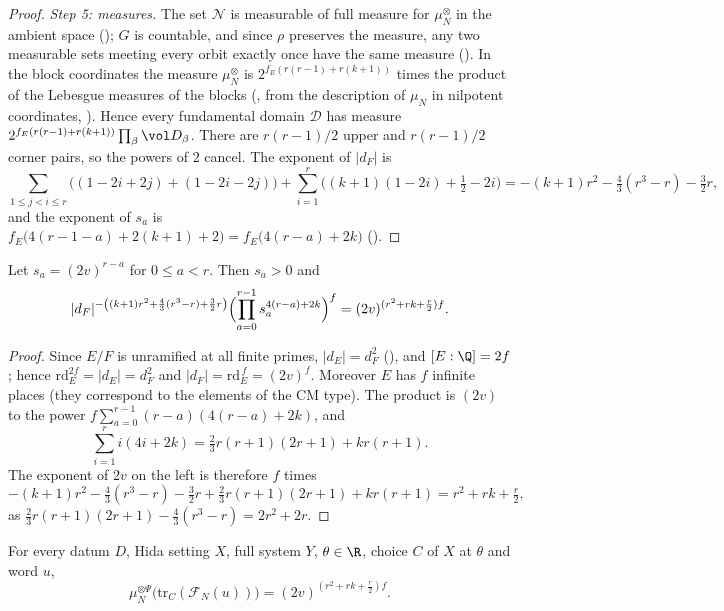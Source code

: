 \begin{proof}
\emph{Step 5: measures.} The set $\mathcal N$ is measurable of full measure for $\mu_N^{\otimes}$ in the ambient space
(); $G$ is countable, and since $\rho$ preserves the measure, any
two measurable sets meeting every orbit exactly once have the same measure
(). In the block coordinates the measure $\mu_N^{\otimes}$ is
$2^{f_E(r(r-1)+r(k+1))}$ times the product of the Lebesgue measures of the blocks
(, from the description of $\mu_N$ in nilpotent coordinates,
). Hence every fundamental domain $\mathcal D$ has measure
$2^{f_E(r(r-1)+r(k+1))}\prod_\beta\vol D_\beta$. There are $r(r-1)/2$ upper and $r(r-1)/2$ corner pairs, so the powers of $2$ cancel. The
exponent of $|d_F|$ is
\[
\sum_{1\le j<i\le r}\bigl((1-2i+2j)+(1-2i-2j)\bigr)+\sum_{i=1}^r\bigl((k+1)(1-2i)+\tfrac12-2i\bigr)
=-(k+1)r^2-\tfrac43(r^3-r)-\tfrac32r,
\]
and the exponent of $s_a$ is $f_E\bigl(4(r-1-a)+2(k+1)+2\bigr)=f_E\bigl(4(r-a)+2k\bigr)$
().
\end{proof}

\begin{lemma}\label{pf:sh-flag:normconst}
Let $s_a=(2v)^{r-a}$ for $0\le a<r$. Then $s_a>0$ and
\[
|d_F|^{-\left((k+1)r^2+\frac43(r^3-r)+\frac32r\right)}\Bigl(\prod_{a=0}^{r-1}s_a^{4(r-a)+2k}\Bigr)^{f}=(2v)^{(r^2+rk+\frac r2)f} .
\]
\end{lemma}

\begin{proof}
Since $E/F$ is unramified at all finite primes, $|d_E|=d_F^2$ (), and $[E:\Q]=2f$; hence
$\mathrm{rd}_E^{2f}=|d_E|=d_F^2$ and $|d_F|=\mathrm{rd}_E^{\,f}=(2v)^f$. Moreover $E$ has $f$ infinite places (they correspond
to the elements of the CM type). The product is $(2v)$ to the power $f\sum_{a=0}^{r-1}(r-a)(4(r-a)+2k)$, and
\[
\sum_{i=1}^ri(4i+2k)=\tfrac23r(r+1)(2r+1)+kr(r+1).
\]
The exponent of $2v$ on the left is therefore $f$ times
\[
-(k+1)r^2-\tfrac43(r^3-r)-\tfrac32r+\tfrac23r(r+1)(2r+1)+kr(r+1)=r^2+rk+\tfrac r2,
\]
as $\frac23r(r+1)(2r+1)-\frac43(r^3-r)=2r^2+2r$.
\end{proof}

\begin{lemma}\label{pf:sh-flag:covdom}
For every datum $D$, Hida setting $X$, full system $Y$, $\theta\in\R$, choice $C$ of $X$ at $\theta$ and word $u$,
\begin{equation}\label{pf:sh-flag:eq:covdom}
\mu_N^{\otimes\Psi}\bigl(\mathrm{tr}_C(\mathcal F_N(u))\bigr)=(2v)^{(r^2+rk+\frac r2)f}.
\end{equation}
\end{lemma}

